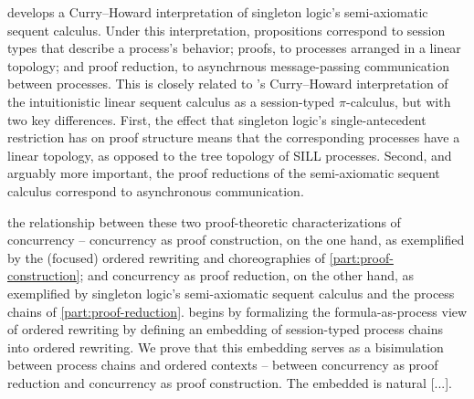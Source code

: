 

 develops a Curry--Howard interpretation of singleton logic's semi-axiomatic sequent calculus.
Under this interpretation, propositions correspond to session types that describe a process's behavior; proofs, to processes arranged in a linear topology; and proof reduction, to asynchrnous message-passing communication between processes.
This is closely related to \citeauthor{Caires+:MSCS??}'s Curry--Howard interpretation of the intuitionistic linear sequent calculus as a session-typed $\pi$-calculus, but with two key differences.
First, the effect that singleton logic's single-antecedent restriction has on proof structure means that the corresponding processes have a linear topology, as opposed to the tree topology of SILL processes.
Second, and arguably more important, the proof reductions of the semi-axiomatic sequent calculus correspond to asynchronous communication.


 the relationship between these two proof-theoretic characterizations of concurrency -- concurrency as proof construction, on the one hand, as exemplified by the (focused) ordered rewriting and choreographies of \cref{part:proof-construction}; and concurrency as proof reduction, on the other hand, as exemplified by singleton logic's semi-axiomatic sequent calculus and the process chains of \cref{part:proof-reduction}.
 begins by formalizing the formula-as-process view of ordered rewriting by defining an embedding of session-typed process chains into ordered rewriting.
We prove that this embedding serves as a bisimulation between process chains and ordered contexts -- between concurrency as proof reduction and concurrency as proof construction.
The embedded is natural [...].




